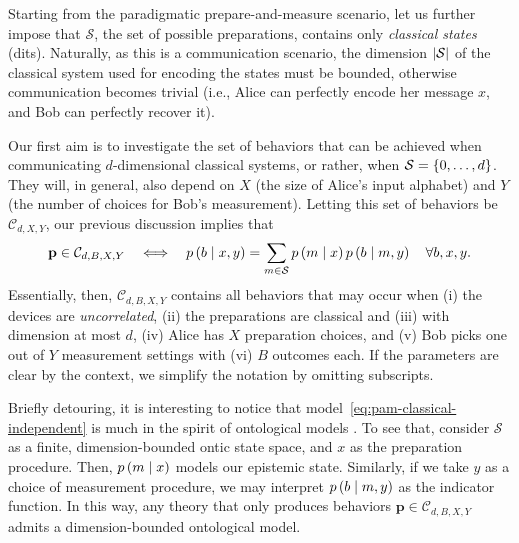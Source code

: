             Starting from the paradigmatic prepare-and-measure scenario, let us further impose that $\mathcal{S}$, the set of possible preparations, contains only \emph{classical states} (dits). Naturally, as this is a communication scenario, the dimension $\abs{\mathcal{S}}$ of the classical system used for encoding the states must be bounded, otherwise communication becomes trivial (i.e., Alice can perfectly encode her message $x$, and Bob can perfectly recover it).
            
            Our first aim is to investigate the set of behaviors that can be achieved when communicating $d$-dimensional classical systems, or rather, when  $\mathcal{S} = \{ 0, \ldots, d \}$. They will, in general, also depend on $X$ (the size of Alice's input alphabet) and $Y$ (the number of choices for Bob's measurement). Letting this set of behaviors be $\mathcal{C}_{d,X,Y}$, our previous discussion implies that
            \begin{equation}
                \mathbf{p} \in \mathcal{C}_{d,B,X,Y} \quad\Longleftrightarrow \quad p \left( b \mid x,y \right) = \sum_{m \in \mathcal{S}} p \left( m \mid x \right) p \left( b \mid m,y \right) \quad\forall b,x,y .
                \label{eq:pam-classical-independent}
            \end{equation}
            Essentially, then, $\mathcal{C}_{d,B,X,Y}$ contains all behaviors that may occur when (i) the devices are \emph{uncorrelated}, (ii) the preparations are classical and (iii) with dimension at most $d$, (iv) Alice has $X$ preparation choices, and (v) Bob picks one out of $Y$ measurement settings with (vi) $B$ outcomes each. If the parameters are clear by the context, we simplify the notation by omitting subscripts.
            
            Briefly detouring, it is interesting to notice that model~\eqref{eq:pam-classical-independent} is much in the spirit of ontological models \cite{spekkens_2005_contextuality,harrigan_2008_ontological,galvao_2009_economical}. To see that, consider $\mathcal{S}$ as a finite, dimension-bounded ontic state space, and $x$ as the preparation procedure. Then, $p \left( m \mid x \right)$ models our epistemic state. Similarly, if we take $y$ as a choice of measurement procedure, we may interpret $p \left( b \mid m,y \right)$ as the indicator function. In this way, any theory that only produces behaviors $\mathbf{p} \in \mathcal{C}_{d,B,X,Y}$ admits a dimension-bounded ontological model.
            
